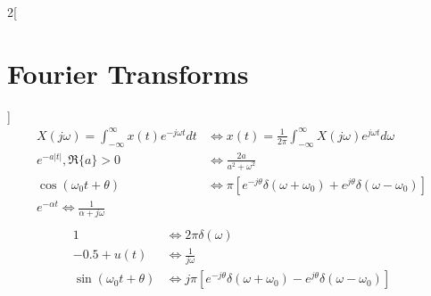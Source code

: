 \documentclass{article}
\begin{document}
    \begin{multicols}{2}[\section*{Fourier Transforms}]
		\begin{align*}
            X(j \omega)=\int_{-\infty}^\infty x(t) e^{-j \omega t}d t & \Leftrightarrow x(t)=\frac{1}{2 \pi} \int_{-\infty}^{\infty} X(j \omega)e^{j \omega t}d \omega\\
            e^{-a|t|}, \Re\{a\}>0 & \Leftrightarrow \frac{2a}{a^2 + \omega^2}\\
            \cos (\omega_0 t + \theta) & \Leftrightarrow \pi \left[ e^{-j \theta}\delta(\omega+\omega_0)+e^{j \theta}\delta(\omega-\omega_0) \right]\\
            e^{-\alpha t} \Leftrightarrow  \frac{1}{\alpha + j\omega}\\
		\end{align*}
        \begin{align*}
            1 & \Leftrightarrow 2\pi\delta(\omega)\\
            -0.5 + u(t) & \Leftrightarrow \frac{1}{j \omega}\\
            \sin (\omega_0 t + \theta) & \Leftrightarrow j \pi \left[ e^{-j \theta}\delta(\omega +\omega_0)-e^{j \theta}\delta(\omega-\omega_0) \right]
        \end{align*}
\end{multicols}
\end{document}
